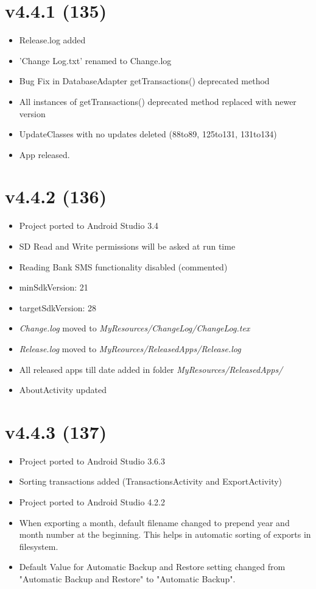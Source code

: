 \documentclass{article}
\begin{document}
    \section{v4.4.1 (135)}\label{sec:135}
    \begin{itemize}
        \item Release.log added
        \item 'Change Log.txt' renamed to Change.log
        \item Bug Fix in DatabaseAdapter getTransactions() deprecated method
        \item All instances of getTransactions() deprecated method replaced with newer version
        \item UpdateClasses with no updates deleted (88to89, 125to131, 131to134)
        \item App released.
    \end{itemize}

    \section{v4.4.2 (136)}\label{sec:136}
    \begin{itemize}
        \item Project ported to Android Studio 3.4
        \item SD Read and Write permissions will be asked at run time
        \item Reading Bank SMS functionality disabled (commented)
        \item minSdkVersion: 21
        \item targetSdkVersion: 28
        \item \textit{Change.log} moved to \textit{MyResources/ChangeLog/ChangeLog.tex}
        \item \textit{Release.log} moved to \textit{MyReources/ReleasedApps/Release.log}
        \item All released apps till date added in folder \textit{MyResources/ReleasedApps/}
        \item AboutActivity updated
    \end{itemize}

    \section{v4.4.3 (137)}\label{sec:137}
    \begin{itemize}
        \item Project ported to Android Studio 3.6.3
        \item Sorting transactions added (TransactionsActivity and ExportActivity)
        \item Project ported to Android Studio 4.2.2
        \item When exporting a month, default filename changed to prepend year and month number at the beginning.
        This helps in automatic sorting of exports in filesystem.
        \item Default Value for Automatic Backup and Restore setting changed from "Automatic Backup and Restore" to "Automatic Backup".
    \end{itemize}
\end{document}
